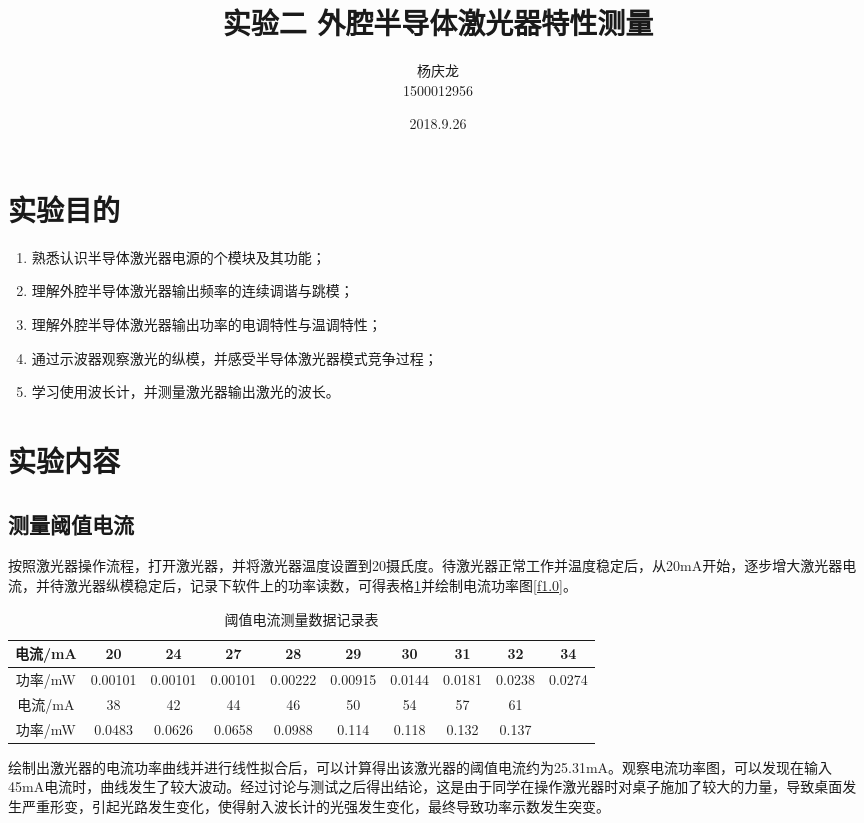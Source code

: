 \documentclass{article}
\begin{document}

\begin{CJK}{UTF8}{gkai}
\title{实验二 外腔半导体激光器特性测量}
\author{杨庆龙 \\1500012956}
\date{2018.9.26}
\maketitle

\section{实验目的}
\begin{enumerate}
  \item 熟悉认识半导体激光器电源的个模块及其功能；
  \item 理解外腔半导体激光器输出频率的连续调谐与跳模；
  \item 理解外腔半导体激光器输出功率的电调特性与温调特性；
  \item 通过示波器观察激光的纵模，并感受半导体激光器模式竞争过程；
  \item 学习使用波长计，并测量激光器输出激光的波长。
\end{enumerate}

\section{实验内容}
\subsection{测量阈值电流}
按照激光器操作流程，打开激光器，并将激光器温度设置到20摄氏度。待激光器正常工作并温度稳定后，从20mA开始，逐步增大激光器电流，并待激光器纵模稳定后，记录下软件上的功率读数，可得表格\ref{t1.0}并绘制电流功率图\ref{f1.0}。\\
\begin{table}[H]
  \centering
  \caption{阈值电流测量数据记录表}
  \label{t1.0}
\begin{tabular}{|c|c|c|c|c|c|c|c|c|c|}
  \hline
  电流/mA&20&24&27&28&29&30&31&32&34\\
  \hline
  功率/mW&0.00101&0.00101&0.00101&0.00222&0.00915&0.0144&0.0181&0.0238&0.0274\\
  \hline
  电流/mA&38&42&44&46&50&54&57&61&\\
  \hline
  功率/mW&0.0483&0.0626&0.0658&0.0988&0.114&0.118&0.132&0.137&\\
  \hline
\end{tabular}
\end{table}
\indent 绘制出激光器的电流功率曲线并进行线性拟合后，可以计算得出该激光器的阈值电流约为25.31mA。观察电流功率图，可以发现在输入45mA电流时，曲线发生了较大波动。经过讨论与测试之后得出结论，这是由于同学在操作激光器时对桌子施加了较大的力量，导致桌面发生严重形变，引起光路发生变化，使得射入波长计的光强发生变化，最终导致功率示数发生突变。


\end{CJK}
\end{document}

